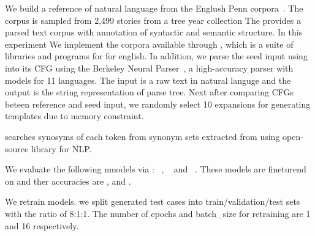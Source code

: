 %
We build a reference \Cfg of natural language from the Englush Penn
\Trb corpora~\cite{mitchell1993treebank,nltkTreebankCorporaWebPage}.
The corpus is sampled from 2,499 stories from a tree year \Wsj
collection The \Trb provides a parsed text corpus with annotation of
syntactic and semantic structure. In this experiment We implement the
\trb corpora available through \Nltk, which is a suite of libraries
and programs for \Nlp for english. In addition, we parse the seed
input using into its CFG using the Berkeley Neural
Parser~\cite{kitaev2018constituency, kitaev2019multilingual}, a
high-accuracy parser with models for 11 languages. The input is a raw
text in natural languge and the output is the string representation of
parse tree. Next after comparing CFGs beteen reference and seed input,
we randomly select 10 expansions for generating templates due to
memory constraint.

%
\Model searches synosyms of each token from synonym sets extracted
from \Wrdnt using \Spacy open-source library for NLP.

%
We evaluate the following \sa nmodels via \Model:
\Bert~\cite{devlin2019bert}, \Roberta~\cite{liu2019roberta} and
\Dbert~\cite{sanh2019distilbert}. These models are fineturend on \Sstt
and ther accuracies are \BertAcc, \RobertaAcc and \DbertAcc.

%
We retrain \sa models. we split \Model generated test cases into
train/validation/test sets with the ratio of 8:1:1. The number of
epochs and batch_size for retraining are 1 and 16 respectively.






